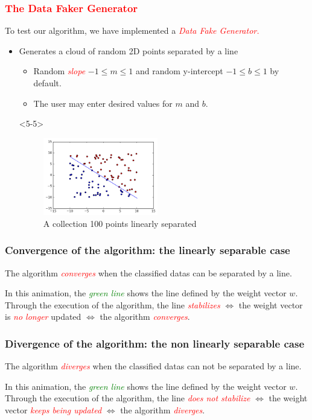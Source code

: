 \documentclass[9pt]{beamer}
\theoremstyle{plain} \newtheorem{Theo}{Theorem}[section]
\theoremstyle{plain} \newtheorem{Prop}{Proposition}[section]
\theoremstyle{plain} \newtheorem{Def}{Definition}[section]
\theoremstyle{plain} \newtheorem{Lem}{Lemma}[section]
\begin{document}
{
\frametitle{\textcolor{red}{The Data Faker Generator }}
To test our algorithm, we have implemented a \textit{\textcolor{red}{Data Fake Generator.}}
\begin{itemize}
\item<2-5> Generates a cloud of random 2D points separated by a line 
\begin{itemize}
\item <3-5> Random \textit{\textcolor{red}{slope}} $ -1 \leq m \leq 1$ and  random y-intercept $ -1 \leq b \leq 1$  by default.
\item <4-5> The user may enter desired values for $m$ and $b$.
\end{itemize}
\item[]<5-5>
\begin{figure}
\centering
\includegraphics[width=5cm]{data_faker_p_N100.png}
\caption{A collection 100 points linearly separated}
\end{figure}
\end{itemize}
}

\frame
{
\frametitle{Convergence of the algorithm: the linearly separable case}
The algorithm \textit{\textcolor{red}{converges}} when the classified datas can be separated by a line.
\centering
{}

\vspace{0.2cm}

In this animation, the \textit{\textcolor{green}{green line}} shows the line defined by the weight vector $w$. Through the execution of the algorithm, the line \textit{\textcolor{red}{stabilizes}} $\iff$ the weight vector is \textit{\textcolor{red}{no longer}} updated $\iff$ the algorithm \textit{\textcolor{red}{converges}}. 
}

\frame
{
\frametitle{Divergence of the algorithm: the non linearly separable case}
The algorithm \textit{\textcolor{red}{diverges}} when the classified datas can not be separated by a line.
\centering
{}

\vspace{0.2cm}

In this animation, the \textit{\textcolor{green}{green line}} shows the line defined by the weight vector $w$. Through the execution of the algorithm, the line \textit{\textcolor{red}{does not stabilize}} $\iff$ the weight vector \textit{\textcolor{red}{keeps being  updated}} $\iff$ the algorithm \textit{\textcolor{red}{diverges}}. 
}
\end{document}
